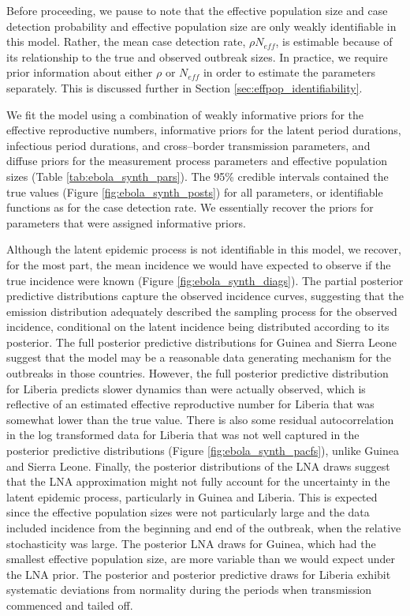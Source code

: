 Before proceeding, we pause to note that the effective population size and case detection probability and effective population size are only weakly identifiable in this model. Rather, the mean case detection rate, $ \rho N_{eff} $, is estimable because of its relationship to the true and observed outbreak sizes. In practice, we require prior information about either $ \rho $ or $ N_{eff} $ in order to estimate the parameters separately. This is discussed further in Section \ref{sec:effpop_identifiability}. 

We fit the model using a combination of weakly informative priors for the effective reproductive numbers, informative priors for the latent period durations, infectious period durations, and cross--border transmission parameters, and diffuse priors for the measurement process parameters and effective population sizes (Table \ref{tab:ebola_synth_pars}). The 95\% credible intervals contained the true values (Figure \ref{fig:ebola_synth_posts}) for all parameters, or identifiable functions as for the case detection rate. We essentially recover the priors for parameters that were assigned informative priors. 

Although the latent epidemic process is not identifiable in this model, we recover, for the most part, the mean incidence we would have expected to observe if the true incidence were known (Figure \ref{fig:ebola_synth_diags}). The partial posterior predictive distributions capture the observed incidence curves, suggesting that the emission distribution adequately described the sampling process for the observed incidence, conditional on the latent incidence being distributed according to its posterior. The full posterior predictive distributions for Guinea and Sierra Leone suggest that the model may be a reasonable data generating mechanism for the outbreaks in those countries. However, the full posterior predictive distribution for Liberia predicts slower dynamics than were actually observed, which is reflective of an estimated effective reproductive number for Liberia that was somewhat lower than the true value. There is also some residual autocorrelation in the log transformed data for Liberia that was not well captured in the posterior predictive distributions (Figure \ref{fig:ebola_synth_pacfs}), unlike Guinea and Sierra Leone. Finally, the posterior distributions of the LNA draws suggest that the LNA approximation might not fully account for the uncertainty in the latent epidemic process, particularly in Guinea and Liberia. This is expected since the effective population sizes were not particularly large and the data included incidence from the beginning and end of the outbreak, when the relative stochasticity was large. The posterior LNA draws for Guinea, which had the smallest effective population size, are more variable than we would expect under the LNA prior. The posterior and posterior predictive draws for Liberia exhibit systematic deviations from normality during the periods when transmission commenced and tailed off.

